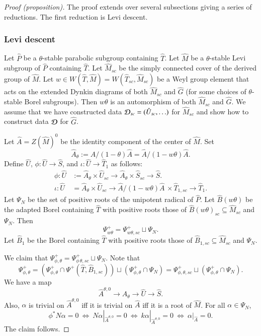 \begin{proof}[Proof (proposition)]

  The proof extends over several subsections giving a series of
  reductions.  The first reduction is Levi descent.

\subsubsection{Levi descent}

Let $\hat P$ be a $\theta$-stable parabolic subgroup containing $\hat
T$.  Let $\hat M$ be a $\theta$-stable Levi subgroup of $\hat P$
containing $\hat T$.  Let $\hat M_{sc}$ be the simply connected cover
of the derived group of $\hat M$.  Let $w\in W(\hat T,\hat M) = W(\hat
T_{sc},\hat M_{sc})$ be a Weyl group element that acts on the extended
Dynkin diagrams of both $\hat M_{sc}$ and $\hat G$ (for some choices
of $\theta$-stable Borel subgroups). Then $w\theta$ is an automorphism
of both $\hat M_{sc}$ and $\hat G$.  We assume that we have
constructed data $\mathcal D_{sc} = (\hat U_{sc},\ldots)$ for $\hat M_{sc}$
and show how to construct data $\mathcal D$ for $\hat G$.

Let $\hat A = Z(\hat M)^0$ be the identity component of the center of
$\hat M$.  Set
  \[
  \hat A_\theta :=  \hat A/(1-\theta)\hat A = \hat A / (1-w\theta)\hat A.
  \]
  Define $\hat U$, $\phi:\hat U\to \hat S$, and $\iota:\hat U\to \hat T_1$ 
  as follows:
  \begin{align*}
  \phi:\hat U &:= \hat A_\theta \times \hat U_{sc} 
  \to \hat A_\theta \times \hat S_{sc}\to \hat S.
  \\
  \iota:\hat U &= \hat A_\theta \times \hat U_{sc} 
  \to \hat A/(1-w\theta)\hat A\,\times
    \hat T_{1,sc} \to \hat T_1.
  \end{align*}
  Let $\Psi_N$ be the set of positive roots of the unipotent radical
  of $\hat P$.  Let $\hat B(w\theta)$ be the adapted Borel containing
  $\hat T$ with positive roots those of $\hat
  B(w\theta)_{sc}\subseteq\hat M_{sc}$ and $\Psi_N$.  Then
  \[
  \Psi_{w\theta}^+ = \Psi_{w\theta,sc}^+ \sqcup \Psi_N.
  \]
  Let $\hat B_1$ be the Borel containing $\hat T$ with positive roots
  those of $\hat B_{1,sc}\subseteq\hat M_{sc}$ and $\Psi_N$.

  We claim that $\Psi_{\phi,\theta}^+ = \Psi_{\phi\,\theta,sc}^+\sqcup
  \Psi_N$.  Note that
  \[
  \Psi_{\phi,\theta}^+ = (\Psi_{\phi,\theta}^+\cap \Psi^+(\hat T,\hat B_{1,sc})) \sqcup
(\Psi_{\phi,\theta}^+ \cap \Psi_N) = 
\Psi_{\phi,\theta,sc}^+\sqcup (\Psi_{\phi,\theta}^+ \cap \Psi_N).
\]
We have a map
  \[
  \hat A^{\theta,0} \to  \hat A_\theta \to \hat U \to \hat S.
  \]
  Also, $\alpha$ is trivial on $\hat A^{\theta,0}$ iff it is trivial on $\hat A$
  iff it is a root of $\hat M$.  For all $\alpha\in \Psi_N$,
  \[
  \phi^* N\alpha = 0 \ \Leftrightarrow \ 
  N\alpha|_{\hat A^{\theta,0}}=0 \ \Leftrightarrow \ 
  k\alpha|_{\hat A^{\theta,0}}=0 \ \Leftrightarrow \ 
  \alpha|_{\hat A}=0.
  \]
  The claim follows.


\end{proof}
